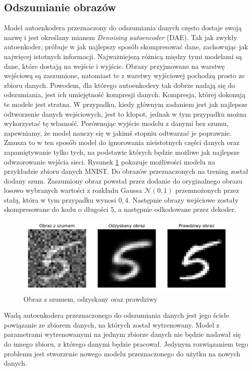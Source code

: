 \documentclass[a4paper,12pt,oneside]{book} %
\begin{document}
\subsection{Odszumianie obrazów}
Model autoenkodera przeznaczony do odszumiania danych często dostaje swoją nazwę i jest określany mianem \textit{Denoising autoencoder} (DAE). Tak jak zwykły autoenkoder, próbuje w jak najlepszy sposób skompresować dane, zachowując jak najwięcej istotnych informacji. Najważniejszą różnicą między tymi modelami są dane, które dostają na wejście i wyjście. Obrazy przyjmowane na warstwę wejściową są zaszumione, natomiast te z warstwy wyjściowej pochodzą prosto ze zbioru danych.
Powodem, dla którego autoenkodery tak dobrze nadają się do odszumiania, jest ich umiejętność kompresji danych. Kompresja, której dokonują te modele jest stratna. W przypadku, kiedy głównym zadaniem jest jak najlepsze odtworzenie danych wejściowych, jest to kłopot, jednak w tym przypadku można wykorzystać tę własność. Porównując wyjście modelu z danymi bez szumu, zapewniamy, że model nauczy się w jakimś stopniu odtwarzać je poprawnie. Zmusza to w ten sposób model do ignorowania nieistotnych części danych oraz zapamiętywanie tylko tych, na podstawie których będzie możliwe jak najlepsze odwzorowanie wejścia sieci.
Rysunek \ref{fig:noisedae} pokazuje możliwości modelu na przykładzie zbioru danych MNIST. Do obrazów przeznaczonych na trening został dodany szum. Zaszumiony obraz powstał przez dodanie do oryginalnego obrazu losowo wybranych wartości z rozkładu Gaussa $\mathcal{N}(0,1)$ przemnożonych przez stałą, która w tym przypadku wynosi $0,4$. Następnie obrazy wejściowe zostały skompresowane do kodu o długości 5, a następnie odkodowane przez dekoder. 
\begin{figure}[h!]
	\centering\includegraphics[width=14.5cm]{denoisingae.pdf}
	\caption{Obraz z szumem, odzyskany oraz prawdziwy}
	\label{fig:noisedae}
\end{figure}

Wadą autoenkodera przeznaczonego do odszumiania danych jest jego ścisłe powiązanie ze zbiorem danych, na których został wytrenowany. Model z parametrami wytrenowanymi na jednym zbiorze danych nie będzie nadawał się do innego zbioru, z którego danymi będzie pracował. Jedynym rozwiązaniem tego problemu jest stworzenie nowego modelu przeznaczonego do użytku na nowych danych. 
\end{document}
